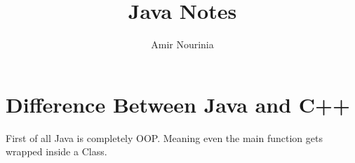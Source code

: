 \documentclass[11pt,twoside,a4paper]{report}
\title{Java Notes}
\author{Amir Nourinia}
\begin{document}
    \section{Difference Between Java and C++}
    First of all Java is completely OOP. Meaning even the main function gets wrapped inside a Class.
    
\end{document}
